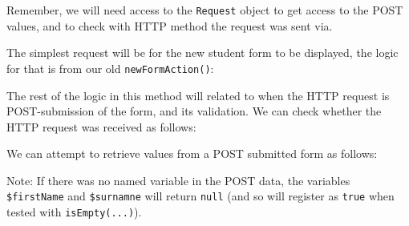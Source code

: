 \documentclass[a4paperpaper,openright]{book}
\newenvironment{Shaded}{}{}
\newcommand{\CommentTok}[1]{\textcolor[rgb]{0.38,0.63,0.69}{\textit{#1}}}
\newcommand{\KeywordTok}[1]{\textcolor[rgb]{0.00,0.44,0.13}{\textbf{#1}}}
\newcommand{\NormalTok}[1]{#1}
\newcommand{\OtherTok}[1]{\textcolor[rgb]{0.00,0.44,0.13}{#1}}
\newcommand{\StringTok}[1]{\textcolor[rgb]{0.25,0.44,0.63}{#1}}
\begin{document}
Remember, we will need access to the \texttt{Request} object to get
access to the POST values, and to check with HTTP method the request was
sent via.

The simplest request will be for the new student form to be displayed,
the logic for that is from our old \texttt{newFormAction()}:

\begin{Shaded}
\end{Shaded}

The rest of the logic in this method will related to when the HTTP
request is POST-submission of the form, and its validation. We can check
whether the HTTP request was received as follows:

\begin{Shaded}
\end{Shaded}

We can attempt to retrieve values from a POST submitted form as follows:

\begin{Shaded}
\end{Shaded}

Note: If there was no named variable in the POST data, the variables
\texttt{\$firstName} and \texttt{\$surnamne} will return \texttt{null}
(and so will register as \texttt{true} when tested with
\texttt{isEmpty(...)}).
\end{document}
